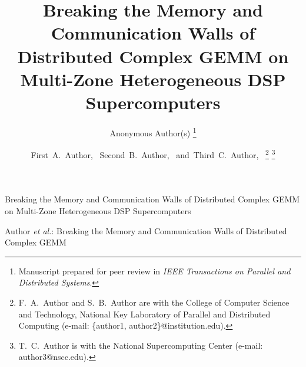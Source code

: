 \documentclass[journal]{IEEEtran}
\begin{document}
\title{Breaking the Memory and Communication Walls of Distributed Complex GEMM on Multi-Zone Heterogeneous DSP Supercomputers}

\ifanonymous
\author{Anonymous Author(s)%
\thanks{Manuscript prepared for peer review in \textit{IEEE Transactions on Parallel and Distributed Systems}.}}
%
{Breaking the Memory and Communication Walls of Distributed Complex GEMM on Multi-Zone Heterogeneous DSP Supercomputers}
\else
\author{First~A.~Author,~
        Second~B.~Author,~
        and~Third~C.~Author,~%
\thanks{F.~A.~Author and S.~B.~Author are with the College of Computer Science and Technology, National Key Laboratory of Parallel and Distributed Computing (e-mail: \{author1, author2\}@institution.edu).}%
\thanks{T.~C.~Author is with the National Supercomputing Center (e-mail: author3@nscc.edu).}}
%
{Author \MakeLowercase{\textit{et al.}}: Breaking the Memory and Communication Walls of Distributed Complex GEMM}
\fi

\maketitle
\end{document}
